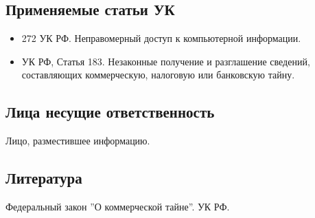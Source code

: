 \subsection*{Применяемые статьи УК}
\begin{itemize}
  \item 272 УК РФ. Неправомерный доступ к компьютерной информации.
  \item УК РФ, Статья 183. Незаконные получение и разглашение сведений,
    составляющих коммерческую, налоговую или банковскую тайну.
\end{itemize}

\subsection*{Лица несущие ответственность}
Лицо, разместившее информацию.

\subsection*{Литература} Федеральный закон ''О коммерческой тайне''. УК РФ.
